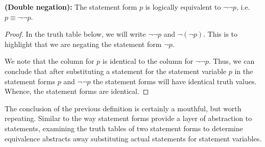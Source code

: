 \guard



\begin{prop}
\label{prop:doubleNegation}
  {\bf (Double negation):}
  The statement form $p$ is logically equivalent to $\neg\neg p$, i.e. $p\equiv \neg\neg p$.
\end{prop}
\begin{proof}
  In the truth table below, we will write $\neg\neg p$ and $\neg(\neg p)$.
  This is to highlight that we are negating the statement form $\neg p$.
  \begin{center}
    
  \end{center}
  We note that the column for $p$ is identical to the column for $\neg\neg p$.
  Thus, we can conclude that after substituting a statement for the statement variable $p$ in the statement forms $p$ and $\neg\neg p$ the statement forms will have identical truth values.
  Whence, the statement forms are identical.
\end{proof}

The conclusion of the previous definition is certainly a mouthful, but worth repeating.
Similar to the way statement forms provide a layer of abstraction to statements, examining the truth tables of two statement forms to determine equivalence abstracts away substituting actual statements for statement variables.
